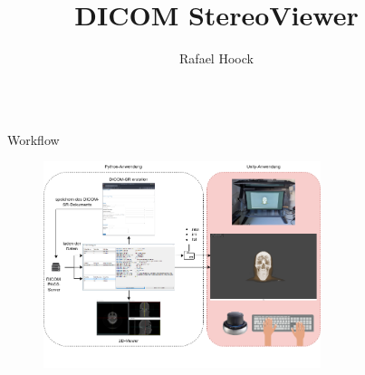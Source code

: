 \documentclass[final,hyperref={pdfpagelabels=false}]{beamer}
\title{\huge DICOM StereoViewer}
\author{Rafael Hoock}
\institute{Fachbereich Informatik und Mikrosystemtechnik}
\begin{document}

\begin{frame}[t] %





\begin{columns}[t] %

\begin{column}{.025\textwidth}\end{column} %

\begin{column}{.465\textwidth} %


\begin{block}{Workflow}

    \begin{figure}
        \centering
        
        \includegraphics[width=0.76\textwidth]{workflow}
                

\end{figure}
\end{block}
\end{column}
\end{columns}
\end{frame}
\end{document}
